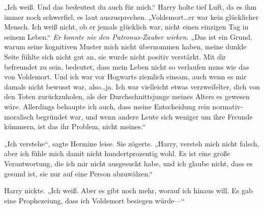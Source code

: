 „Ich weiß. Und das bedeutest du auch für mich.“
Harry holte tief Luft, da es ihm immer noch schwerfiel, es laut auszusprechen.
„Voldemort…er war kein glücklicher Mensch. Ich weiß nicht, ob er jemals glücklich war, nicht einen einzigen Tag in seinem Leben.“
\emph{Er konnte nie den Patronus-Zauber wirken.}
„Das ist ein Grund, warum seine kognitiven Muster mich nicht übernommen haben, meine dunkle Seite fühlte sich nicht gut an, sie wurde nicht positiv verstärkt. Mit dir befreundet zu sein, bedeutet, dass mein Leben nicht so verlaufen muss wie das von Voldemort. Und ich war vor Hogwarts ziemlich einsam, auch wenn es mir damals nicht bewusst war, also…ja. Ich war vielleicht etwas verzweifelter, dich von den Toten zurückzuholen, als der Durchschnittsjunge meines Alters es gewesen wäre. Allerdings behaupte ich auch, dass meine Entscheidung rein normativ-moralisch begründet war, und wenn andere Leute sich weniger um ihre Freunde kümmern, ist das ihr Problem, nicht meines.“

„Ich verstehe“, sagte Hermine leise. Sie zögerte. „Harry, versteh mich nicht falsch, aber ich fühle mich damit nicht hundertprozentig wohl. Es ist eine große Verantwortung, die ich mir nicht ausgesucht habe, und ich glaube nicht, dass es gesund ist, sie nur auf eine Person abzuwälzen.“

Harry nickte.
„Ich weiß. Aber es gibt noch mehr, worauf ich hinaus will. Es gab eine Prophezeiung, dass ich Voldemort besiegen würde—“

